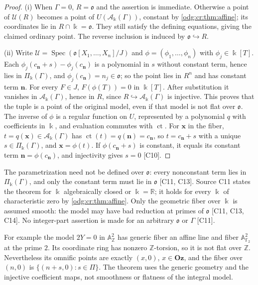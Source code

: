 \documentclass[11pt,oneside]{article}
\numberwithin{equation}{section}
\theoremstyle{definition}
\theoremstyle{remark}
\newcommand{\Oz}{\mathbf{Oz}}
\newcommand{\Z}{\mathbb Z}
\newcommand{\R}{\mathbb R}
\newcommand{\ct}{\operatorname{ct}}
\newcommand{\src}[1]{\textup{\textsf{\small[#1]}}}
\newcommand{\crA}{\mathcal A_\Bbbk(\Gamma)}
\newcommand{\crP}{\Pi_\Bbbk(\Gamma)}
\newcommand{\Aff}{\mathbb A}
\newcommand{\Spec}{\operatorname{Spec}}
\begin{document}
\begin{proof}
(i) When $\Gamma=0$, $R=\mathfrak o$ and the assertion is immediate.
Otherwise a point of $\mathcal U(R)$ becomes a point of $U(\crA)$, constant by
\cref{odg:cr:thm:affine}; its coordinates lie in $R\cap\Bbbk=\mathfrak o$.
They still satisfy the defining equations, giving the claimed ordinary point.
The reverse inclusion is induced by $\mathfrak o\hookrightarrow R$.

(ii) Write $\mathcal U=\Spec(\mathfrak o[X_1,\ldots,X_n]/J)$ and
$\phi=(\phi_1,\ldots,\phi_n)$ with $\phi_j\in\Bbbk[T]$. Each
$\phi_j(c_{\mathbf n}+s)-\phi_j(c_{\mathbf n})$ is a polynomial in $s$ without constant
term, hence lies in $\crP$, and $\phi_j(c_{\mathbf n})=n_j\in\mathfrak o$; so the point
lies in $R^n$ and has constant term $\mathbf n$. For every $F\in J$,
$F(\phi(T))=0$ in $\Bbbk[T]$. After substitution it vanishes in $\crA$, hence
in $R$, since $R\hookrightarrow\crA$ is injective. This proves that the tuple
is a point of the original model, even if that model is not flat over
$\mathfrak o$. The inverse
of $\phi$ is a regular function on $U$, represented by a polynomial $q$ with
coefficients in $\Bbbk$, and evaluation commutes with $\ct$. For $\mathbf x$ in the
fiber, $t=q(\mathbf x)\in\crA$ has $\ct(t)=q(\mathbf n)=c_{\mathbf n}$, so
$t=c_{\mathbf n}+s$ with a unique $s\in\crP$, and $\mathbf x=\phi(t)$. If
$\phi(c_{\mathbf n}+s)$ is constant, it equals its constant term
$\mathbf n=\phi(c_{\mathbf n})$, and injectivity gives $s=0$ \src{C10}.
\end{proof}

The parametrization need not be defined over $\mathfrak o$: every nonconstant term
lies in $\crP$, and only the constant term must lie in $\mathfrak o$
\src{C11, C13}. Source C11 states the theorem for $\Bbbk$ algebraically closed or
$\Bbbk=\R$; it holds for every $\Bbbk$ of characteristic zero by
\cref{odg:cr:thm:affine}. Only the geometric fiber over $\Bbbk$ is assumed smooth:
the model may have bad reduction at primes of $\mathfrak o$ \src{C11, C13, C14}. No
integer-part assertion is made for an arbitrary $\mathfrak o$ or $\Gamma$ \src{C11}.

For example the model $2Y=0$ in $\Aff^2_\Z$ has generic fiber an affine line
and fiber $\Aff^2_{\mathbb F_2}$ at the prime $2$. Its coordinate ring has
nonzero $\Z$-torsion, so it is not flat over $\Z$. Nevertheless its omnific
points are exactly $(x,0)$, $x\in\Oz$, and the fiber over $(n,0)$ is
$\{(n+s,0):s\in\Pi\}$. The theorem uses the generic geometry and the injective
coefficient maps, not smoothness or flatness of the integral model.
\end{document}
